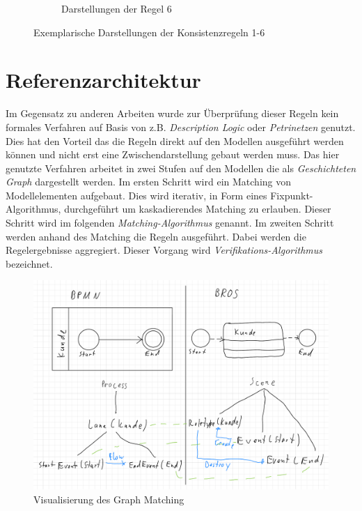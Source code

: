 \begin{figure}
\begin{subfigure}{0.4\textwidth}
        \caption{Darstellungen der Regel 6}%
        \label{fig:ruleExample6}
    \end{subfigure}
    \caption{Exemplarische Darstellungen der Konsistenzregeln 1-6}%
    \label{fig:pizzaBrosSteps}
\end{figure}

\section{Referenzarchitektur}

Im Gegensatz zu anderen Arbeiten wurde zur Überprüfung dieser Regeln kein formales Verfahren auf Basis von z.B. \emph{Description Logic} oder \emph{Petrinetzen} genutzt.
Dies hat den Vorteil das die Regeln direkt auf den Modellen ausgeführt werden können und nicht erst eine Zwischendarstellung gebaut werden muss.
Das hier genutzte Verfahren arbeitet in zwei Stufen auf den Modellen die als \emph{Geschichteten Graph} dargestellt werden.
Im ersten Schritt wird ein Matching von Modellelementen aufgebaut.
Dies wird iterativ, in Form eines Fixpunkt-Algorithmus, durchgeführt um kaskadierendes Matching zu erlauben.
Dieser Schritt wird im folgenden \emph{Matching-Algorithmus} genannt.
Im zweiten Schritt werden anhand des Matching die Regeln ausgeführt.
Dabei werden die Regelergebnisse aggregiert.
Dieser Vorgang wird \emph{Verifikations-Algorithmus} bezeichnet.

\begin{figure}
    \centering
    \includegraphics[width=\textwidth,keepaspectratio]{../images/ModelToGraph.pdf}%
    \caption{Visualisierung des Graph Matching}%
    \label{fig:ModelToGraph}
\end{figure}

